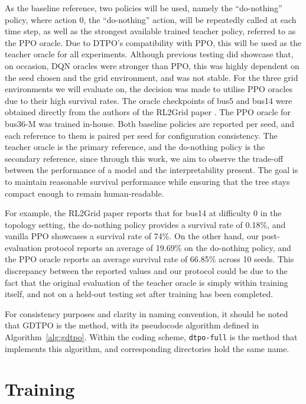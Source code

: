 As the baseline reference, two policies will be used, namely the ``do-nothing'' policy, where action 0, the ``do-nothing'' action, will be repeatedly called at each time step, as well as the strongest available trained teacher policy, referred to as the PPO oracle. Due to DTPO's compatibility with PPO, this will be used as the teacher oracle for all experiments. Although previous testing did showcase that, on occasion, DQN oracles were stronger than PPO, this was highly dependent on the seed chosen and the grid environment, and was not stable. For the three grid environments we will evaluate on, the decision was made to utilise PPO oracles due to their high survival rates. The oracle checkpoints of bus5 and bus14 were obtained directly from the authors of the RL2Grid paper \cite{marchesini2025rl2grid}. The PPO oracle for bus36-M was trained in-house. Both baseline policies are reported per seed, and each reference to them is paired per seed for configuration consistency. The teacher oracle is the primary reference, and the do-nothing policy is the secondary reference, since through this work, we aim to observe the trade-off between the performance of a model and the interpretability present. The goal is to maintain reasonable survival performance while ensuring that the tree stays compact enough to remain human-readable.

For example, the RL2Grid paper \cite{marchesini2025rl2grid} reports that for bus14 at difficulty 0 in the topology setting, the do-nothing policy provides a survival rate of 0.18\%, and vanilla PPO showcases a survival rate of 74\%. On the other hand, our post-evaluation protocol reports an average of 19.69\% on the do-nothing policy, and the PPO oracle reports an average survival rate of 66.85\% across 10 seeds. This discrepancy between the reported values and our protocol could be due to the fact that the original evaluation of the teacher oracle is simply within training itself, and not on a held-out testing set after training has been completed.

For consistency purposes and clarity in naming convention, it should be noted that GDTPO is the method, with its pseudocode algorithm defined in Algorithm~\ref{alg:gdtpo}. Within the coding scheme, \texttt{dtpo-full} is the method that implements this algorithm, and corresponding directories hold the same name.

\section{Training}

